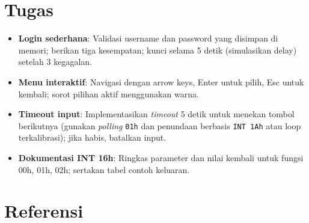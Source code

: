 \section{Tugas}
\begin{itemize}
  \item \textbf{Login sederhana}: Validasi username dan password yang disimpan di memori; berikan tiga kesempatan; kunci selama 5 detik (simulasikan delay) setelah 3 kegagalan.
  \item \textbf{Menu interaktif}: Navigasi dengan arrow keys, Enter untuk pilih, Esc untuk kembali; sorot pilihan aktif menggunakan warna.
  \item \textbf{Timeout input}: Implementasikan \textit{timeout} 5 detik untuk menekan tombol berikutnya (gunakan \textit{polling} \texttt{01h} dan penundaan berbasis \texttt{INT 1Ah} atau loop terkalibrasi); jika habis, batalkan input.
  \item \textbf{Dokumentasi INT 16h}: Ringkas parameter dan nilai kembali untuk fungsi 00h, 01h, 02h; sertakan tabel contoh keluaran.
\end{itemize}

\section{Referensi}
